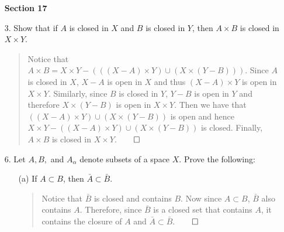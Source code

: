 \documentclass[12pt, a4paper]{article}
\begin{document}
\begin{itemize}
\item[]
\item[]
\item[]

{\large \textbf{Section 17}}
\vspace{0.3cm}
\item[3.]
Show that if $A$ is closed in $X$ and $B$ is closed in $Y$, then $A \times B$ is closed in $X \times Y$.
\begin{quote}
Notice that $A \times B = X \times Y - (((X - A) \times Y) \cup (X \times (Y - B)))$.
Since $A$ is closed in $X$, $X - A$ is open in $X$ and thus $(X - A) \times Y$ is open in $X \times Y$.
Similarly, since $B$ is closed in $Y$, $Y - B$ is open in $Y$ and therefore $X \times (Y - B)$ is open in $X \times Y$.
Then we have that $((X - A) \times Y) \cup (X \times (Y - B))$ is open and hence $X \times Y - ((X - A) \times Y) \cup (X \times (Y - B))$
is closed. Finally, $A \times B$ is closed in $X \times Y$.$\qed$
\end{quote}

\item[]
\item[]

\item[6.]
Let $A, B,$ and $A_\alpha$ denote subsets of a space $X$. Prove the following:
\begin{itemize}
\item[(a)]
If $A \subset B$, then $\bar{A} \subset \bar{B}$.
\begin{quote}
Notice that $\bar{B}$ is closed and contains $B$. Now since $A \subset B$, $\bar{B}$ also
contains $A$. Therefore, since $\bar{B}$ is a closed set that contains $A$,
it contains the closure of $A$ and $\bar{A} \subset \bar{B}$.$\qed$
\end{quote}

\item[]
\item[]


\end{itemize}
\end{itemize}
\end{document}
